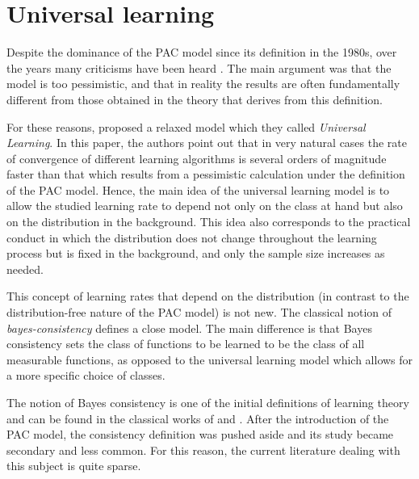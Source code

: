 \documentclass[12pt,a4paper,oneside,onecolumn]{book}
\begin{document}
\section{Universal learning}

%


Despite the dominance of the PAC model since its definition in the 1980s, over the years many criticisms have been heard \citep{buntine1990theory, sarrett1989average, 10.1162/neco.1992.4.2.249, NIPS1990_816b112c}. The main argument was that the model is too pessimistic, and that in reality the results are often fundamentally different from those obtained in the theory that derives from this definition. 

For these reasons, \citeauthor{DBLP:conf/stoc/BousquetHMHY21} proposed a relaxed model which they called \emph{Universal Learning}. In this paper, the authors point out that in very natural cases the rate of convergence of different learning algorithms is several orders of magnitude faster than that which results from a pessimistic calculation under the definition of the PAC model. 
Hence, the main idea of the universal learning model is to allow the studied learning rate to depend not only on the class at hand but also on the distribution in the background.
This idea also corresponds to the practical conduct in which the distribution does not change throughout the learning process but is fixed in the background, and only the sample size increases as needed.

This concept of learning rates that depend on the distribution (in contrast to the distribution-free nature of the PAC model) is not new. The classical notion of \emph{bayes-consistency} defines a close model. The main difference is that Bayes consistency sets the class of functions to be learned to be the class of all measurable functions, as opposed to the universal learning model which allows for a more specific choice of classes.

The notion of Bayes consistency is one of the initial definitions of learning theory and can be found in the classical works of \citet{fisher1922mathematical, stone1977consistent, 1053964} and \citet{fix1989discriminatory}.
After the introduction of the PAC model, the consistency definition was pushed aside and its study became secondary and less common. For this reason, the current literature dealing with this subject is quite sparse. 
\end{document}
